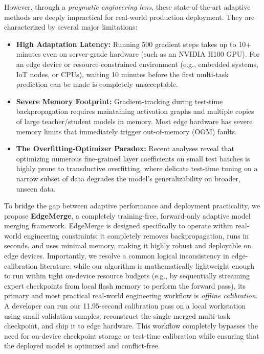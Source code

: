 However, through a \emph{pragmatic engineering lens}, these state-of-the-art adaptive methods are deeply impractical for real-world production deployment. They are characterized by several major limitations:
\begin{itemize}
    \item \textbf{High Adaptation Latency:} Running 500 gradient steps takes up to 10+ minutes even on server-grade hardware (such as an NVIDIA H100 GPU). For an edge device or resource-constrained environment (e.g., embedded systems, IoT nodes, or CPUs), waiting 10 minutes before the first multi-task prediction can be made is completely unacceptable.
    \item \textbf{Severe Memory Footprint:} Gradient-tracking during test-time backpropagation requires maintaining activation graphs and multiple copies of large teacher/student models in memory. Most edge hardware has severe memory limits that immediately trigger out-of-memory (OOM) faults.
    \item \textbf{The Overfitting-Optimizer Paradox:} Recent analyses reveal that optimizing numerous fine-grained layer coefficients on small test batches is highly prone to transductive overfitting, where delicate test-time tuning on a narrow subset of data degrades the model's generalizability on broader, unseen data.
\end{itemize}

To bridge the gap between adaptive performance and deployment practicality, we propose \textbf{EdgeMerge}, a completely training-free, forward-only adaptive model merging framework. EdgeMerge is designed specifically to operate within real-world engineering constraints: it completely removes backpropagation, runs in seconds, and uses minimal memory, making it highly robust and deployable on edge devices. Importantly, we resolve a common logical inconsistency in edge-calibration literature: while our algorithm is mathematically lightweight enough to run within tight on-device resource budgets (e.g., by sequentially streaming expert checkpoints from local flash memory to perform the forward pass), its primary and most practical real-world engineering workflow is \emph{offline calibration}. A developer can run our 11.95-second calibration pass on a local workstation using small validation samples, reconstruct the single merged multi-task checkpoint, and ship it to edge hardware. This workflow completely bypasses the need for on-device checkpoint storage or test-time calibration while ensuring that the deployed model is optimized and conflict-free. 

